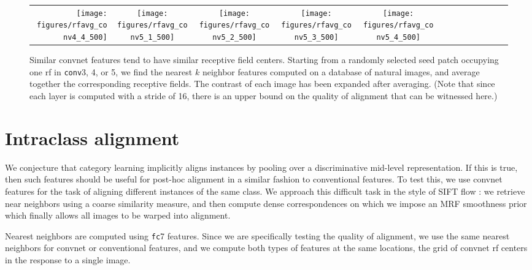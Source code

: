 \documentclass{article} \usepackage{nips14submit_e,times}
\begin{document}
\begin{figure}
{\begin{tabular}{rcccc@{\hskip 5pt}cccc@{\hskip 5pt}cccc}
\texttt{[image: figures/rfavg\_conv4\_4\_500]} &
\texttt{[image: figures/rfavg\_conv5\_1\_500]} &
\texttt{[image: figures/rfavg\_conv5\_2\_500]} &
\texttt{[image: figures/rfavg\_conv5\_3\_500]} &
\texttt{[image: figures/rfavg\_conv5\_4\_500]}
\end{tabular}
}
\caption{
Similar convnet features tend to have similar receptive field centers.
Starting from a randomly selected seed patch occupying one rf in
\texttt{conv}3, 4, or 5, we find the nearest $k$ neighbor features computed on a
database of natural images, and average together the corresponding receptive
fields.
The contrast of each image has been expanded after averaging.
(Note that since each layer is computed with a stride of 16, there is an
upper bound on the quality of alignment that can be witnessed here.)
}
\label{fig:rfavg}
\end{figure}



\section{Intraclass alignment}
\label{sec:flow}
We conjecture that category learning implicitly aligns instances by pooling over
a discriminative mid-level representation.
If this is true, then such features should be useful for post-hoc alignment in a
similar fashion to conventional features.
To test this, we use convnet features for the task of aligning different instances
of the same class.
We approach this difficult task in the style of SIFT flow \cite{sift-flow}: we
retrieve near neighbors using a coarse similarity measure, and then compute
dense correspondences on which we impose an MRF smoothness prior which finally
allows all images to be warped into alignment.

Nearest neighbors are computed using \texttt{fc}7 features.
Since we are specifically testing the quality of alignment, we use the
same nearest neighbors for convnet or conventional features, and we compute both
types of features at the same locations, the grid of convnet rf centers in the
response to a single image.
\end{document}
